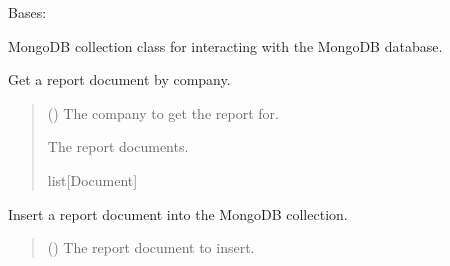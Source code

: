 \documentclass[letterpaper,10pt,english]{sphinxmanual}
\begin{document}
\begin{fulllineitems}
\label{\detokenize{src:src.db_utils.mongo.MongCollection}}
\pysigstartsignatures
{}
\pysigstopsignatures
\sphinxAtStartPar
Bases: 

\sphinxAtStartPar
MongoDB collection class for interacting with the MongoDB database.

\begin{fulllineitems}
\label{\detokenize{src:src.db_utils.mongo.MongCollection.get_report_by_company}}
\pysigstartsignatures
{}
\pysigstopsignatures
\sphinxAtStartPar
Get a report document by company.
\begin{quote}\begin{description}
\sphinxAtStartPar
{} () \textendash{} The company to get the report for.

\sphinxAtStartPar
The report documents.

\sphinxAtStartPar
list{[}Document{]}

\end{description}\end{quote}

\end{fulllineitems}


\begin{fulllineitems}
\label{\detokenize{src:src.db_utils.mongo.MongCollection.insert_report}}
\pysigstartsignatures
{}
\pysigstopsignatures
\sphinxAtStartPar
Insert a report document into the MongoDB collection.
\begin{quote}\begin{description}
\sphinxAtStartPar
{} () \textendash{} The report document to insert.


\end{description}
\end{quote}
\end{fulllineitems}
\end{fulllineitems}
\end{document}
